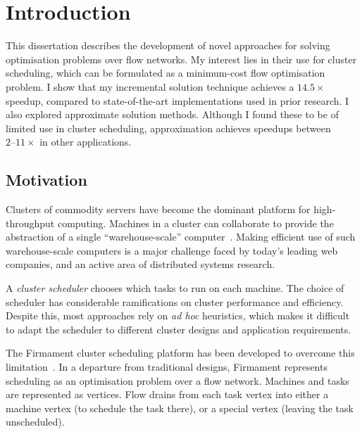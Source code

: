 \chapter{Introduction} \label{chap:intro}


This dissertation describes the development of novel approaches for solving optimisation problems over flow networks. My interest lies in their use for cluster scheduling, which can be formulated as a minimum-cost flow optimisation problem. I show that my incremental solution technique achieves a $14.5\times$ speedup, compared to state-of-the-art implementations used in prior research. I also explored approximate solution methods. Although I found these to be of limited use in cluster scheduling, approximation achieves speedups between $2\text{--}11\times$ in other applications.

\section{Motivation} \label{sec:intro-motivation}
Clusters of commodity servers have become the dominant platform for high-throughput computing. Machines in a cluster can collaborate to provide the abstraction of a single ``warehouse-scale'' computer~\cite{WarehouseScale:2009}. Making efficient use of such warehouse-scale computers is a major challenge faced by today's leading web companies, and an active area of distributed systems research.

A \emph{cluster scheduler} chooses which tasks to run on each machine. The choice of scheduler has considerable ramifications on cluster performance and efficiency. Despite this, most approaches rely on \emph{ad hoc} heuristics, which makes it difficult to adapt the scheduler to different cluster designs and application requirements.

The Firmament cluster scheduling platform has been developed to overcome this limitation\footnotemark~\cite[ch.~5]{Schwarzkopf:2015}. In a departure from traditional designs, Firmament represents scheduling as an optimisation problem over a flow network. Machines and tasks are represented as vertices. Flow drains from each task vertex into either a machine vertex (to schedule the task there), or a special vertex (leaving the task unscheduled).

